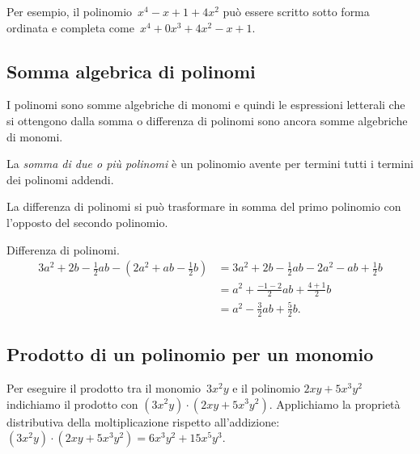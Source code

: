 Per esempio, il polinomio~$x^4-x+1+4x^2$ può essere scritto sotto forma 
ordinata e completa come~$x^4+0x^3+4x^2-x+1$.


\subsection{Somma algebrica di polinomi}
\label{subsec:10_poli_somma}

I polinomi sono somme algebriche di monomi e quindi le espressioni 
letterali che si ottengono dalla somma
o differenza di polinomi sono ancora somme algebriche di monomi.

\begin{definizione}
La \emph{somma di due o più polinomi} è un polinomio avente per termini 
tutti i termini dei polinomi addendi.
\end{definizione}

La differenza di polinomi si può trasformare in somma del primo polinomio 
con l'opposto del secondo polinomio.

\begin{exrig}
\begin{esempio}
Differenza di polinomi.
\begin{equation*}
\begin{split}
3a^2+2b-\frac{1}{2}ab-\left(2a^2+ab-\frac{1}{2}b\right)&=3a^2+2b-\frac{1}{2}
ab-2a^2-ab+\frac{1}{2}b\\
&=a^2+\frac{-1-2}{2}ab+\frac{4+1}{2}b\\
&=a^2-\frac{3}{2}ab+\frac{5}{2}b.
\end{split}
\end{equation*}
\end{esempio}
\end{exrig}


\subsection{Prodotto di un polinomio per un monomio}
\label{subsec:10_poli_prodottopermonomio}

Per eseguire il prodotto tra il monomio~$3x^{2}y$ e il polinomio
$2{xy}+5x^{3}y^{2}$ indichiamo il prodotto con
$\left(3x^{2}y\right)\cdot \left(2{xy}+5x^{3}y^{2}\right)$.
Applichiamo la proprietà distributiva della moltiplicazione rispetto
all'addizione:~$\left(3x^{2}y\right)\cdot
\left(2{xy}+5x^{3}y^{2}\right)=6x^{3}y^{2}+15x^{5}y^{3}$.

